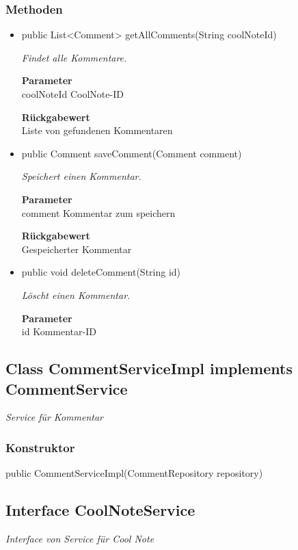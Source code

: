 \documentclass[a4paper]{scrreprt}
\begin{document}
        \subsubsection{Methoden}
        \begin{itemize}
        	\item{public List<Comment> getAllComments(String coolNoteId)}
        	
        	\textit{Findet alle Kommentare.}
        	
        	\textbf{Parameter} \\
        	coolNoteId CoolNote-ID
        	
        	\textbf{Rückgabewert} \\
        	Liste von gefundenen Kommentaren        \item{public Comment saveComment(Comment comment)}
        	
        	\textit{Speichert einen Kommentar.}
        	
        	\textbf{Parameter} \\
        	comment Kommentar zum speichern
        	
        	\textbf{Rückgabewert} \\
        	Gespeicherter Kommentar        \item{public void deleteComment(String id)}
        	
        	\textit{Löscht einen Kommentar.}
        	
        	\textbf{Parameter} \\
        	id Kommentar-ID
        	
        	
        \end{itemize}
        \subsection{Class CommentServiceImpl implements CommentService}
        \textit{Service für Kommentar}
        \subsubsection{Konstruktor}
        public CommentServiceImpl(CommentRepository repository)
        \subsection{Interface CoolNoteService}
        \textit{Interface von Service für Cool Note}
\end{document}
